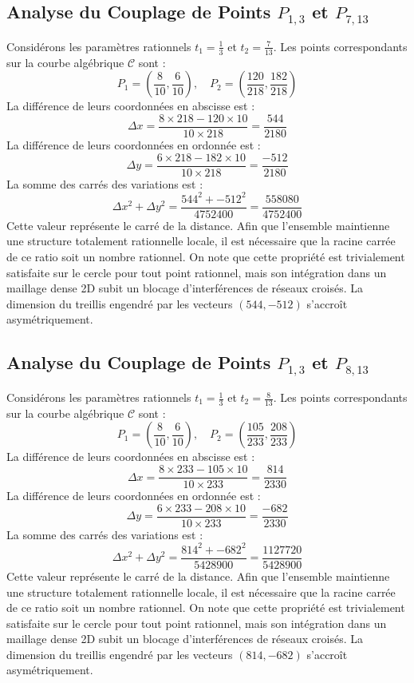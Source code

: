 \documentclass[12pt, a4paper]{article}
\begin{document}
\subsection{Analyse du Couplage de Points $P_{1,3}$ et $P_{7,13}$}
Considérons les paramètres rationnels $t_1 = \frac{1}{3}$ et $t_2 = \frac{7}{13}$.
Les points correspondants sur la courbe algébrique $\mathcal{C}$ sont :
$$ P_1 = \left( \frac{8}{10}, \frac{6}{10} \right), \quad P_2 = \left( \frac{120}{218}, \frac{182}{218} \right) $$
La différence de leurs coordonnées en abscisse est :
$$ \Delta x = \frac{8 \times 218 - 120 \times 10}{10 \times 218} = \frac{544}{2180} $$
La différence de leurs coordonnées en ordonnée est :
$$ \Delta y = \frac{6 \times 218 - 182 \times 10}{10 \times 218} = \frac{-512}{2180} $$
La somme des carrés des variations est :
$$ \Delta x^2 + \Delta y^2 = \frac{ 544^2 + -512^2 }{ 4752400 } = \frac{ 558080 }{ 4752400 } $$
Cette valeur représente le carré de la distance. Afin que l'ensemble maintienne une structure totalement rationnelle locale, il est nécessaire que la racine carrée de ce ratio soit un nombre rationnel. On note que cette propriété est trivialement satisfaite sur le cercle pour tout point rationnel, mais son intégration dans un maillage dense 2D subit un blocage d'interférences de réseaux croisés. La dimension du treillis engendré par les vecteurs $( 544, -512 )$ s'accroît asymétriquement.


\subsection{Analyse du Couplage de Points $P_{1,3}$ et $P_{8,13}$}
Considérons les paramètres rationnels $t_1 = \frac{1}{3}$ et $t_2 = \frac{8}{13}$.
Les points correspondants sur la courbe algébrique $\mathcal{C}$ sont :
$$ P_1 = \left( \frac{8}{10}, \frac{6}{10} \right), \quad P_2 = \left( \frac{105}{233}, \frac{208}{233} \right) $$
La différence de leurs coordonnées en abscisse est :
$$ \Delta x = \frac{8 \times 233 - 105 \times 10}{10 \times 233} = \frac{814}{2330} $$
La différence de leurs coordonnées en ordonnée est :
$$ \Delta y = \frac{6 \times 233 - 208 \times 10}{10 \times 233} = \frac{-682}{2330} $$
La somme des carrés des variations est :
$$ \Delta x^2 + \Delta y^2 = \frac{ 814^2 + -682^2 }{ 5428900 } = \frac{ 1127720 }{ 5428900 } $$
Cette valeur représente le carré de la distance. Afin que l'ensemble maintienne une structure totalement rationnelle locale, il est nécessaire que la racine carrée de ce ratio soit un nombre rationnel. On note que cette propriété est trivialement satisfaite sur le cercle pour tout point rationnel, mais son intégration dans un maillage dense 2D subit un blocage d'interférences de réseaux croisés. La dimension du treillis engendré par les vecteurs $( 814, -682 )$ s'accroît asymétriquement.
\end{document}
